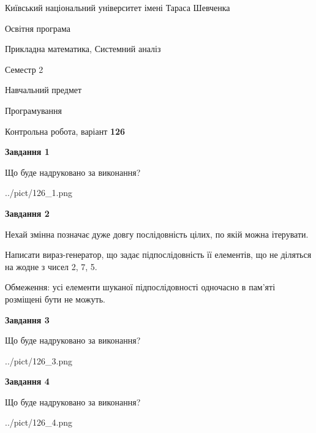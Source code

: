 \documentclass[12pt, ukrainian]{article}
\begin{document}
{{\begin {small}\par
{ \center  Київський національний університет імені Тараса Шевченка \par}
{\parbox {5 cm}{Освітня програма \hfill}{\parbox {8 cm}{Прикладна математика, Системний аналіз \hfill}}\parbox {5 cm}{\hfill Семестр 2}}\par
{\parbox {5 cm} {Навчальний предмет \hfill}\parbox {7 cm}{Програмування \hfill}\parbox {6cm}{\hfill}\par}\vspace{-7pt} \end{small}}{\center Контрольна робота, варіант  \No \textbf
{ 126 }\par}}
{
\begin {large}
{\begin {center}\textbf{Завдання 1}\end {center}}\par
Що буде надруковано за виконання?\par\par
\begin{center}
	{../pict/126_1.png}
\end{center}
\newpage

{\begin {center}\textbf{Завдання 2}\end {center}}\par
Нехай змінна  позначає дуже довгу послідовність цілих, по якій можна ітерувати.

Написати вираз-генератор, що задає підпослідовність її елементів, що не діляться на жодне з чисел 2, 7, 5.

Обмеження: усі елементи шуканої підпослідовності одночасно в пам'яті розміщені бути не можуть.\par
\newpage

{\begin {center}\textbf{Завдання 3}\end {center}}\par
Що буде надруковано за виконання?\par
\begin{center}
	{../pict/126_3.png}
\end{center}
\newpage

{\begin {center}\textbf{Завдання 4}\end {center}}\par
Що буде надруковано за виконання?\par
\begin{center}
	{../pict/126_4.png}
\end{center}
\newpage


\end{large}}
\end{document}
